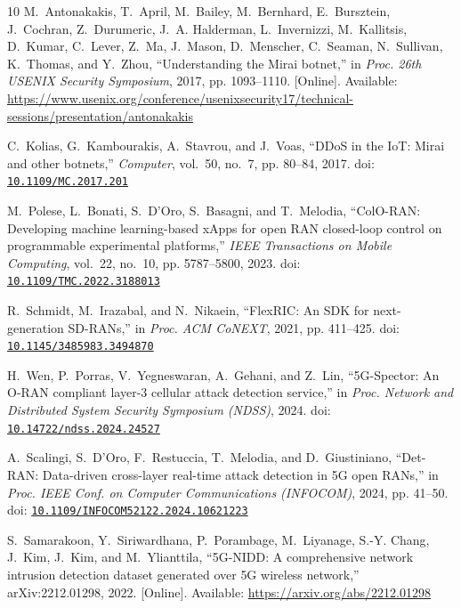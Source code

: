 \begin{thebibliography}{10}
\BIBentryALTinterwordspacing
M.~Antonakakis, T.~April, M.~Bailey, M.~Bernhard, E.~Bursztein, J.~Cochran,
  Z.~Durumeric, J.~A. Halderman, L.~Invernizzi, M.~Kallitsis, D.~Kumar,
  C.~Lever, Z.~Ma, J.~Mason, D.~Menscher, C.~Seaman, N.~Sullivan, K.~Thomas,
  and Y.~Zhou, ``Understanding the {Mirai} botnet,'' in \emph{Proc. 26th USENIX
  Security Symposium}, 2017, pp. 1093--1110. [Online]. Available:
  \url{https://www.usenix.org/conference/usenixsecurity17/technical-sessions/presentation/antonakakis}
\BIBentrySTDinterwordspacing

C.~Kolias, G.~Kambourakis, A.~Stavrou, and J.~Voas, ``{DDoS} in the {IoT}:
  {Mirai} and other botnets,'' \emph{Computer}, vol.~50, no.~7, pp. 80--84,
  2017. doi:
  \href{https://doi.org/10.1109/MC.2017.201}{\nolinkurl{10.1109/MC.2017.201}}

M.~Polese, L.~Bonati, S.~D'Oro, S.~Basagni, and T.~Melodia, ``{ColO-RAN}:
  Developing machine learning-based {xApps} for open {RAN} closed-loop control
  on programmable experimental platforms,'' \emph{IEEE Transactions on Mobile
  Computing}, vol.~22, no.~10, pp. 5787--5800, 2023. doi:
  \href{https://doi.org/10.1109/TMC.2022.3188013}{\nolinkurl{10.1109/TMC.2022.3188013}}

R.~Schmidt, M.~Irazabal, and N.~Nikaein, ``{FlexRIC}: An {SDK} for
  next-generation {SD-RANs},'' in \emph{Proc. ACM CoNEXT}, 2021, pp. 411--425.
  doi:
  \href{https://doi.org/10.1145/3485983.3494870}{\nolinkurl{10.1145/3485983.3494870}}

\BIBentryALTinterwordspacing
H.~Wen, P.~Porras, V.~Yegneswaran, A.~Gehani, and Z.~Lin, ``{5G-Spector}: An
  {O-RAN} compliant layer-3 cellular attack detection service,'' in \emph{Proc.
  Network and Distributed System Security Symposium (NDSS)}, 2024. doi:
  \href{https://doi.org/10.14722/ndss.2024.24527}{\nolinkurl{10.14722/ndss.2024.24527}}
\BIBentrySTDinterwordspacing

A.~Scalingi, S.~D'Oro, F.~Restuccia, T.~Melodia, and D.~Giustiniano,
  ``{Det-RAN}: Data-driven cross-layer real-time attack detection in {5G} open
  {RANs},'' in \emph{Proc. IEEE Conf. on Computer Communications (INFOCOM)},
  2024, pp. 41--50. doi:
  \href{https://doi.org/10.1109/INFOCOM52122.2024.10621223}{\nolinkurl{10.1109/INFOCOM52122.2024.10621223}}

\BIBentryALTinterwordspacing
S.~Samarakoon, Y.~Siriwardhana, P.~Porambage, M.~Liyanage, S.-Y. Chang, J.~Kim,
  J.~Kim, and M.~Ylianttila, ``{5G-NIDD}: A comprehensive network intrusion
  detection dataset generated over {5G} wireless network,'' arXiv:2212.01298,
  2022. [Online]. Available: \url{https://arxiv.org/abs/2212.01298}
\BIBentrySTDinterwordspacing


\end{thebibliography}
